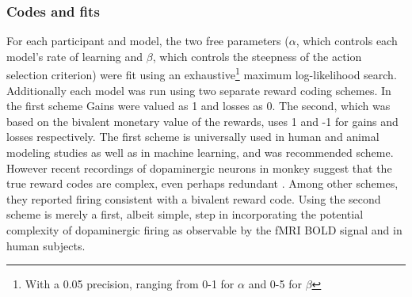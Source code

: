 \documentclass[doc,12pt]{apa}        %
\begin{document}
\subsubsection{Codes and fits}
\label{subsub:codesandfits}
For each participant and model, the two free parameters ($\alpha$, which controls each model's rate of learning and $\beta$, which controls the steepness of the action selection criterion) were fit using an exhaustive\footnote{With a 0.05 precision, ranging from 0-1 for $\alpha$ and 0-5 for $\beta$} maximum log-likelihood search.  Additionally each model was run using two separate reward coding schemes.  In the first scheme Gains were valued as 1 and losses as 0.  The second, which was based on the bivalent monetary value of the rewards, uses 1 and -1 for gains and losses respectively.  The first scheme is universally used in human and animal modeling studies as well as in machine learning, and was  recommended scheme.  However recent recordings of dopaminergic neurons in monkey suggest that the true reward codes are complex, even perhaps redundant \cite{Kim:2006p1063,Matsumoto:2009p7219}.  Among other schemes, they reported firing consistent with a bivalent reward code.  Using the second scheme is merely a first, albeit simple, step in incorporating the potential complexity of dopaminergic firing as observable by the fMRI BOLD signal and in human subjects.
\end{document}
